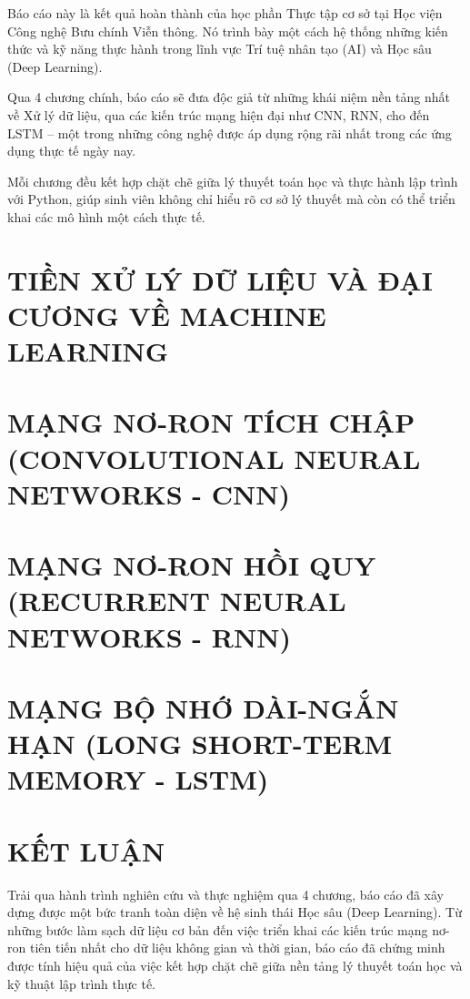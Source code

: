 \documentclass[12pt, a4paper]{article}
\begin{document}
Báo cáo này là kết quả hoàn thành của học phần Thực tập cơ sở tại Học viện Công nghệ Bưu chính Viễn thông. Nó trình bày một cách hệ thống những kiến thức và kỹ năng thực hành trong lĩnh vực Trí tuệ nhân tạo (AI) và Học sâu (Deep Learning).

Qua 4 chương chính, báo cáo sẽ đưa độc giả từ những khái niệm nền tảng nhất về Xử lý dữ liệu, qua các kiến trúc mạng hiện đại như CNN, RNN, cho đến LSTM -- một trong những công nghệ được áp dụng rộng rãi nhất trong các ứng dụng thực tế ngày nay.

Mỗi chương đều kết hợp chặt chẽ giữa lý thuyết toán học và thực hành lập trình với Python, giúp sinh viên không chỉ hiểu rõ cơ sở lý thuyết mà còn có thể triển khai các mô hình một cách thực tế.

\newpage


\section{TIỀN XỬ LÝ DỮ LIỆU VÀ ĐẠI CƯƠNG VỀ MACHINE LEARNING}

\newpage

\section{MẠNG NƠ-RON TÍCH CHẬP (CONVOLUTIONAL NEURAL NETWORKS - CNN)}

\newpage

\section{MẠNG NƠ-RON HỒI QUY (RECURRENT NEURAL NETWORKS - RNN)}

\newpage

\section{MẠNG BỘ NHỚ DÀI-NGẮN HẠN (LONG SHORT-TERM MEMORY - LSTM)}

\newpage

\section*{KẾT LUẬN}

Trải qua hành trình nghiên cứu và thực nghiệm qua 4 chương, báo cáo đã xây dựng được một bức tranh toàn diện về hệ sinh thái Học sâu (Deep Learning). Từ những bước làm sạch dữ liệu cơ bản đến việc triển khai các kiến trúc mạng nơ-ron tiên tiến nhất cho dữ liệu không gian và thời gian, báo cáo đã chứng minh được tính hiệu quả của việc kết hợp chặt chẽ giữa nền tảng lý thuyết toán học và kỹ thuật lập trình thực tế.
\end{document}
